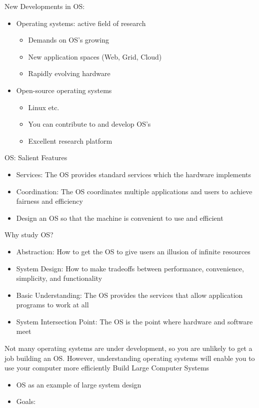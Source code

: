\documentclass[12pt]{article}
\begin{document}
New Developments in OS:
\begin{itemize}
    \item Operating systems: active field of research
    \begin{itemize}
        \item Demands on OS's growing
        \item New application spaces (Web, Grid, Cloud)
        \item Rapidly evolving hardware
    \end{itemize}
    \item Open-source operating systems
    \begin{itemize}
        \item Linux etc.
        \item You can contribute to and develop OS's
        \item Excellent research platform
    \end{itemize}
\end{itemize}
OS: Salient Features
\begin{itemize}
    \item Services: The OS provides standard services which the hardware implements
    \item Coordination: The OS coordinates multiple applications and users to achieve fairness and efficiency
    \item Design an OS so that the machine is convenient to use and efficient
\end{itemize}
Why study OS?
\begin{itemize}
    \item Abstraction: How to get the OS to give users an illusion of infinite resources
    \item System Design: How to make tradeoffs between performance, convenience, simplicity, and functionality
    \item Basic Understanding: The OS provides the services that allow application programs to work at all
    \item System Intersection Point: The OS is the point where hardware and software meet
\end{itemize}

Not many operating systems are under development, so you are unlikely to get a job building an OS. However, understanding operating systems will enable you to use your computer more efficiently \newline
Build Large Computer Systems
\begin{itemize}
    \item OS as an example of large system design
    \item Goals: 
\end{itemize}
\end{document}
